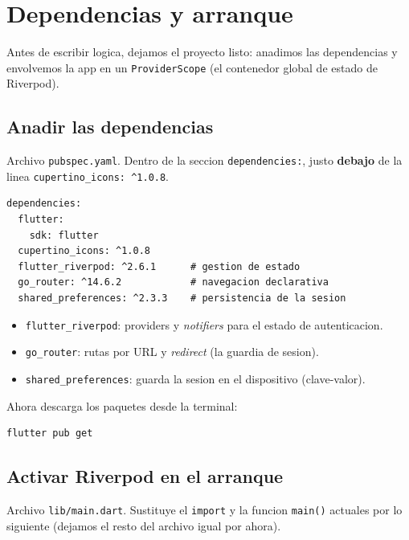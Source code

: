 \documentclass[11pt,a4paper,oneside]{book}
\newcommand{\file}[1]{\texttt{\textcolor{brandDark}{#1}}}
\begin{document}
\chapter{Dependencias y arranque}
Antes de escribir logica, dejamos el proyecto listo: anadimos las dependencias y
envolvemos la app en un \texttt{ProviderScope} (el contenedor global de estado de
Riverpod).

\section{Anadir las dependencias}
\begin{wherebox}
Archivo \file{pubspec.yaml}. Dentro de la seccion \texttt{dependencies:}, justo
\textbf{debajo} de la linea \texttt{cupertino\_icons: \^{}1.0.8}.
\end{wherebox}

\begin{lstlisting}[language={}]
dependencies:
  flutter:
    sdk: flutter
  cupertino_icons: ^1.0.8
  flutter_riverpod: ^2.6.1      # gestion de estado
  go_router: ^14.6.2            # navegacion declarativa
  shared_preferences: ^2.3.3    # persistencia de la sesion
\end{lstlisting}

\begin{whatbox}
\begin{itemize}
  \item \texttt{flutter\_riverpod}: providers y \emph{notifiers} para el estado de autenticacion.
  \item \texttt{go\_router}: rutas por URL y \emph{redirect} (la guardia de sesion).
  \item \texttt{shared\_preferences}: guarda la sesion en el dispositivo (clave-valor).
\end{itemize}
\end{whatbox}

Ahora descarga los paquetes desde la terminal:
\begin{lstlisting}[language={},numbers=none]
flutter pub get
\end{lstlisting}

\section{Activar Riverpod en el arranque}
\begin{wherebox}
Archivo \file{lib/main.dart}. Sustituye el \texttt{import} y la funcion
\texttt{main()} actuales por lo siguiente (dejamos el resto del archivo igual por
ahora).
\end{wherebox}
\end{document}
